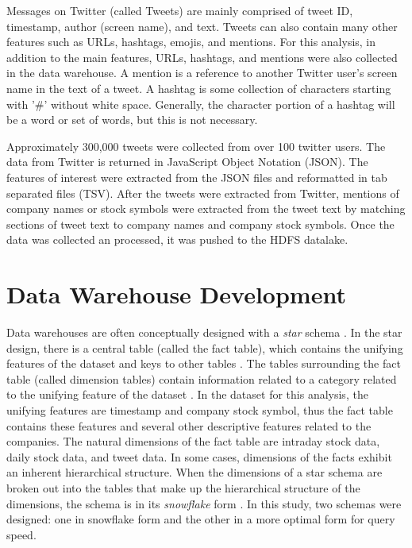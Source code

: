 \documentclass[journal]{IEEEtran}
\begin{document}
Messages on Twitter (called Tweets) are mainly comprised of
 tweet ID, timestamp, author (screen name), and text.
Tweets can also contain many other features such as
 URLs, hashtags, emojis,  and mentions.
For this analysis, in addition to the main features,
 URLs, hashtags, and mentions were also collected in the data warehouse.
A mention is a reference to another Twitter user's screen name
 in the text of a tweet.
A hashtag is some collection of characters starting with
 '\#' without white space.
Generally, the character portion of a hashtag will be a word or set of words,
 but this is not necessary.

Approximately 300,000 tweets were collected from over 100 twitter users.
The data from Twitter is returned in JavaScript Object Notation (JSON).
The features of interest were extracted from the JSON files and
 reformatted in tab separated files (TSV).
After the tweets were extracted from Twitter,
 mentions of company names or stock symbols were extracted from the tweet text by
 matching sections of tweet text to company names and company stock symbols.
Once the data was collected an processed, it was pushed to the HDFS datalake.


\section{Data Warehouse Development}

Data warehouses are often conceptually designed with a \textit{star} schema 
 \cite{BuildingtheDWCH11}.
In the star design, there is a central table (called the fact table),
 which contains the unifying features of the dataset and keys to other tables
 \cite{BuildingtheDWCH11}.
The tables surrounding the fact table (called dimension tables) 
 contain information related to a category related to the unifying feature
 of the dataset \cite{BuildingtheDWCH11}.
In the dataset for this analysis, the unifying features are timestamp and
 company stock symbol, thus the fact table contains these features
 and several other descriptive features related to the companies.
The natural dimensions of the fact table are intraday stock data,
 daily stock data, and tweet data.
In some cases, dimensions of the facts exhibit an
 inherent hierarchical structure. 
When the dimensions of a star schema are broken out into the tables
 that make up the hierarchical structure of the dimensions, the schema
 is in its \textit{snowflake} form \cite{BuildingtheDWCH11}.
In this study, two schemas were designed: one in snowflake form and
 the other in a more optimal form for query speed.
\end{document}
